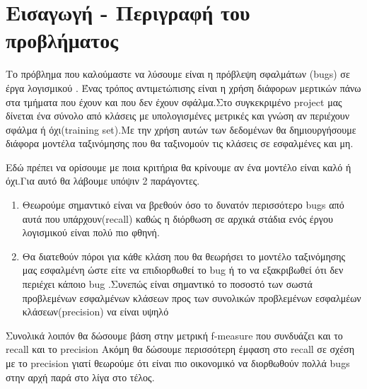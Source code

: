 \chapter{Εισαγωγή - Περιγραφή του προβλήματος}

Το πρόβλημα που καλούμαστε να λύσουμε είναι η πρόβλεψη σφαλμάτων (bugs) σε έργα λογισμικού .
Ένας τρόπος αντιμετώπισης είναι η χρήση διάφορων μερτικών πάνω στα τμήματα που έχουν και που δεν έχουν σφάλμα.Στο συγκεκριμένο project μας δίνεται ένα σύνολο από κλάσεις με υπολογισμένες μετρικές και γνώση αν περιέχουν σφάλμα ή όχι(training set).Με την χρήση αυτών των δεδομένων θα  δημιουργήσουμε διάφορα μοντέλα ταξινόμησης που θα ταξινομούν  τις κλάσεις σε εσφαλμένες και μη.


Εδώ πρέπει να ορίσουμε με ποια κριτήρια θα κρίνουμε αν ένα μοντέλο είναι καλό ή όχι.Για αυτό θα λάβουμε υπόψιν 2 παράγοντες.
\begin{enumerate}
\item Θεωρούμε  σημαντικό είναι να βρεθούν όσο το δυνατόν περισσότερο bugs από αυτά που υπάρχουν(recall)  καθώς η διόρθωση σε αρχικά στάδια ενός έργου λογισμικού είναι πολύ πιο φθηνή.
\item  Θα  διατεθούν πόροι για κάθε κλάση που θα θεωρήσει το μοντέλο  ταξινόμησης μας εσφαλμένη ώστε είτε να επιδιορθωθεί το bug ή το να εξακριβωθεί ότι δεν περιέχει κάποιο bug .Συνεπώς είναι σημαντικό το ποσοστό των  σωστά προβλεμένων εσφαλμένων κλάσεων προς των συνολικών προβλεμένων εσφαλμέων κλάσεων(precision) να είναι υψηλό
\end{enumerate}
Συνολικά λοιπόν θα δώσουμε βάση στην μετρική f-measure που συνδυάζει και το recall και το precision Ακόμη  θα δώσουμε περισσότερη έμφαση στο recall σε σχέση με το precision γιατί θεωρούμε ότι είναι πιο οικονομικό να διορθωθούν πολλά bugs στην αρχή παρά στο λίγα στο τέλος. 
\newpage
